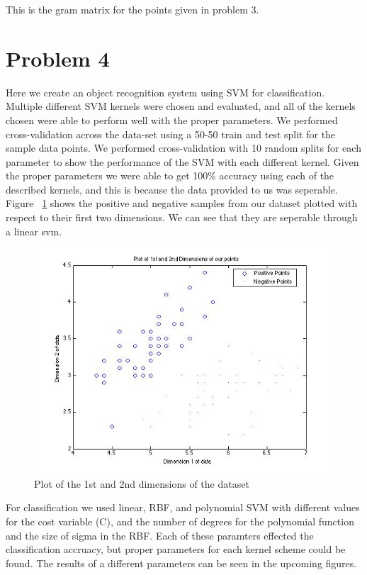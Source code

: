 \documentclass[paper=a4, fontsize=11pt]{scrartcl} %
\begin{document}
This is the gram matrix for the points given in problem 3.

\section{Problem 4}

Here we create an object recognition system using SVM for classification.
Multiple different SVM kernels were chosen and evaluated, and all of the kernels chosen were able to perform well with the proper parameters.  
We performed cross-validation across the data-set using a 50-50 train and test split for the sample data points.
We performed cross-validation with 10 random splits for each parameter to show the performance of the SVM with each different kernel.
Given the proper parameters we were able to get 100\% accuracy using each of the described kernels, and this is because the data provided to us was seperable.  
Figure ~\ref{fig:plot_2d} shows the positive and negative samples from our dataset plotted with respect to their first two dimensions.
We can see that they are seperable through a linear svm.

\begin{figure}
\centering
\includegraphics[scale=0.4]{serperability.jpg}
\caption{Plot of the 1st and 2nd dimensions of the dataset}
\label{fig:plot_2d}
\end{figure}

For classification we used linear, RBF, and polynomial SVM with different values for the cost variable (C), and the number of degrees for the polynomial function and the size of sigma in the RBF.
Each of these paramters effected the classification accruacy, but proper parameters for each kernel scheme could be found.
The results of a different parameters can be seen in the upcoming figures.
\end{document}
